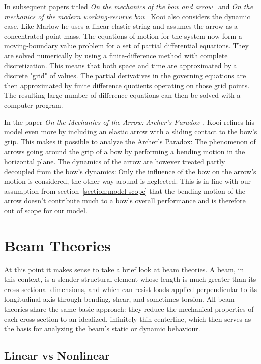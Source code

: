In subsequent papers titled \textit{On the mechanics of the bow and arrow}~\cite{bib:kooi81} and \textit{On the mechanics of the modern working-recurve bow}~\cite{bib:kooi91} Kooi also considers the dynamic case.
Like Marlow he uses a linear-elastic string and assumes the arrow as a concentrated point mass. The equations of motion for the system now form a moving-boundary value problem for a set of partial differential equations.
They are solved numerically by using a finite-difference method with complete discretization.
This means that both space and time are approximated by a discrete "grid" of values.
The partial derivatives in the governing equations are then approximated by finite difference quotients operating on those grid points.
The resulting large number of difference equations can then be solved with a computer program.

In the paper \textit{On the Mechanics of the Arrow: Archer's Paradox}~\cite{bib:kosp97}, Kooi refines his model even more by including an elastic arrow with a sliding contact to the bow's grip. This makes it possible to analyze the Archer's Paradox: The phenomenon of arrows going around the grip of a bow by performing a bending motion in the horizontal plane.
The dynamics of the arrow are however treated partly decoupled from the bow's dynamics: Only the influence of the bow on the arrow's motion is considered, the other way around is neglected.
This is in line with our assumption from section~\ref{section:model-scope} that the bending motion of the arrow doesn't contribute much to a bow's overall performance and is therefore out of scope for our model.

\newpage
\section{Beam Theories}

At this point it makes sense to take a brief look at beam theories.
A beam, in this context, is a slender structural element whose length is much greater than its cross‑sectional dimensions, and which can resist loads applied perpendicular to its longitudinal axis through bending, shear, and sometimes torsion.
All beam theories share the same basic approach: they reduce the mechanical properties of each cross‑section to an idealized, infinitely thin centerline, which then serves as the basis for analyzing the beam's static or dynamic behaviour.

\subsection*{Linear vs Nonlinear}

